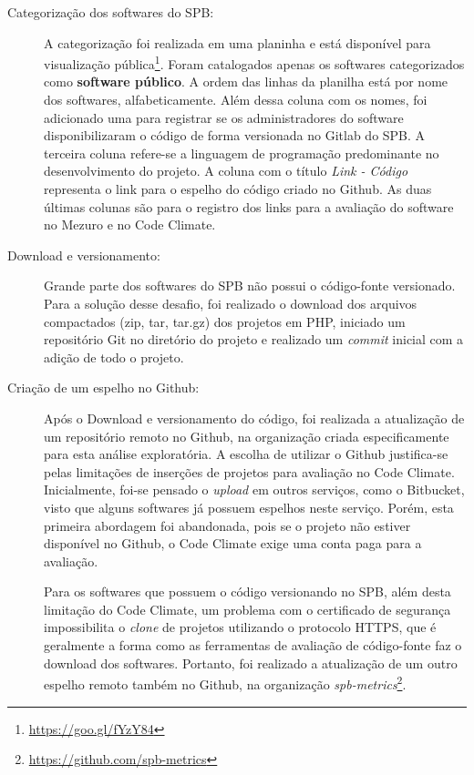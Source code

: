 \begin{description}

  \item [Categorização dos softwares do SPB:]
    A categorização foi realizada em uma planinha e está disponível para
    visualização pública\footnote{\url{https://goo.gl/fYzY84}}. Foram
    catalogados apenas os softwares categorizados como \textbf{software público}.
    A ordem das linhas da planilha está por nome dos softwares, alfabeticamente.
    Além dessa coluna com os nomes, foi adicionado uma para registrar se os
    administradores do software disponibilizaram o código de forma versionada no
    Gitlab do SPB. A terceira coluna refere-se a linguagem de programação
    predominante no desenvolvimento do projeto. A coluna com o título
    \textit{Link - Código} representa o link para o espelho do código criado no
    Github. As duas últimas colunas são para o registro dos links para a
    avaliação do software no Mezuro e no Code Climate.

  \item [Download e versionamento:]
    Grande parte dos softwares do SPB não possui o código-fonte versionado. Para
    a solução desse desafio, foi realizado o download dos arquivos compactados
    (zip, tar, tar.gz) dos projetos em PHP, iniciado um repositório Git no
    diretório do projeto e realizado um \textit{commit} inicial com a adição de
    todo o projeto.

  \item [Criação de um espelho no Github:]
    Após o Download e versionamento do código, foi realizada a atualização de um
    repositório remoto no Github, na organização criada especificamente para esta
    análise exploratória. A escolha de utilizar o Github justifica-se pelas
    limitações de inserções de projetos para avaliação no Code Climate.
    Inicialmente, foi-se pensado o \textit{upload} em outros serviços, como o
    Bitbucket, visto que alguns softwares já possuem espelhos neste serviço.
    Porém, esta primeira abordagem foi abandonada, pois se o projeto não
    estiver disponível no Github, o Code Climate exige uma conta paga para a
    avaliação.

    Para os softwares que possuem o código versionando no SPB, além desta
    limitação do Code Climate, um problema com o certificado de segurança
    impossibilita o \textit{clone} de projetos utilizando o protocolo HTTPS, que
    é geralmente a forma como as ferramentas de avaliação de código-fonte faz o
    download dos softwares. Portanto, foi realizado a atualização de um outro
    espelho remoto também no Github, na organização
    \textit{spb-metrics}\footnote{\url{https://github.com/spb-metrics}}.


\end{description}
